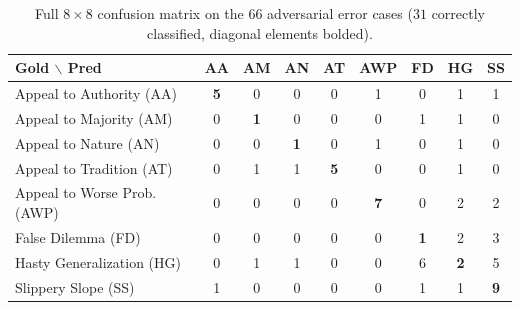 \documentclass[11pt]{article}
\begin{document}
\begin{table}[t]
\centering
\small
\begin{tabular}{lcccccccc}
\toprule
\textbf{Gold $\backslash$ Pred} & \textbf{AA} & \textbf{AM} & \textbf{AN} & \textbf{AT} & \textbf{AWP} & \textbf{FD} & \textbf{HG} & \textbf{SS} \\
\midrule
Appeal to Authority (AA) & \textbf{5} & 0 & 0 & 0 & 1 & 0 & 1 & 1 \\
Appeal to Majority (AM)  & 0 & \textbf{1} & 0 & 0 & 0 & 1 & 1 & 0 \\
Appeal to Nature (AN)    & 0 & 0 & \textbf{1} & 0 & 1 & 0 & 1 & 0 \\
Appeal to Tradition (AT) & 0 & 1 & 1 & \textbf{5} & 0 & 0 & 1 & 0 \\
Appeal to Worse Prob. (AWP) & 0 & 0 & 0 & 0 & \textbf{7} & 0 & 2 & 2 \\
False Dilemma (FD)       & 0 & 0 & 0 & 0 & 0 & \textbf{1} & 2 & 3 \\
Hasty Generalization (HG)& 0 & 1 & 1 & 0 & 0 & 6 & \textbf{2} & 5 \\
Slippery Slope (SS)      & 1 & 0 & 0 & 0 & 0 & 1 & 1 & \textbf{9} \\
\bottomrule
\end{tabular}
\caption{Full $8 \times 8$ confusion matrix on the 66 adversarial error cases ($31$ correctly classified, diagonal elements bolded).}
\label{tab:confusion_matrix}
\end{table}
\end{document}
